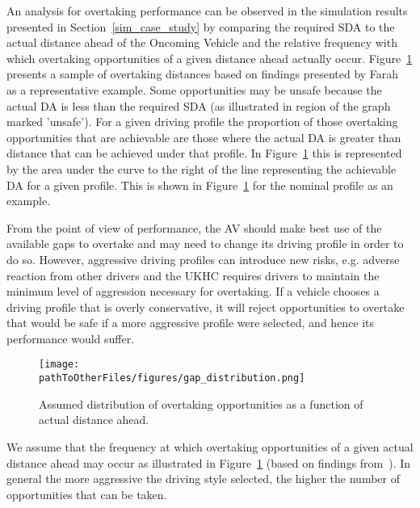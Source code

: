An analysis for overtaking performance can be observed in the simulation results presented in Section~\ref{sim_case_study} by comparing the required SDA to the actual distance ahead of the Oncoming Vehicle and the relative frequency with which overtaking opportunities of a given distance ahead actually occur. Figure~\ref{fig:distribution} presents a sample of overtaking distances based on findings presented by Farah~\cite{farah2016drivers} as a representative example. Some opportunities may be unsafe because the actual DA is less than the required SDA (as illustrated in region of the graph marked 'unsafe'). For a given driving profile the proportion of those overtaking opportunities that are achievable are those where the actual DA is greater than distance that can be achieved under that profile. In Figure~\ref{fig:distribution} this is represented by the area under the curve to the right of the line representing the achievable DA for a given profile. This is shown in Figure~\ref{fig:distribution} for the nominal profile as an example. 

From the point of view of performance, the AV should make best use of the available gaps to overtake and may need to change its driving profile in order to do so. 
%
However, aggressive driving profiles can introduce new risks, e.g. adverse reaction from other drivers and the UKHC requires drivers to maintain the minimum level of aggression necessary for overtaking.
%
If a vehicle chooses a driving profile that is overly conservative, it will reject opportunities to overtake that would be safe if a more aggressive profile were selected, and hence its performance would suffer. 
%

\begin{figure}
    \centering
    \texttt{[image: \\pathToOtherFiles/figures/gap\_distribution.png]}
    \caption{Assumed distribution of overtaking opportunities as a function of actual distance ahead.}
    \label{fig:distribution}
\end{figure} 

We assume that the frequency at which overtaking opportunities of a given actual distance ahead may occur as illustrated in Figure~\ref{fig:distribution} (based on findings from~\cite{farah2016drivers}). 
%
In general the more aggressive the driving style selected, the higher the number of opportunities that can be taken. 


